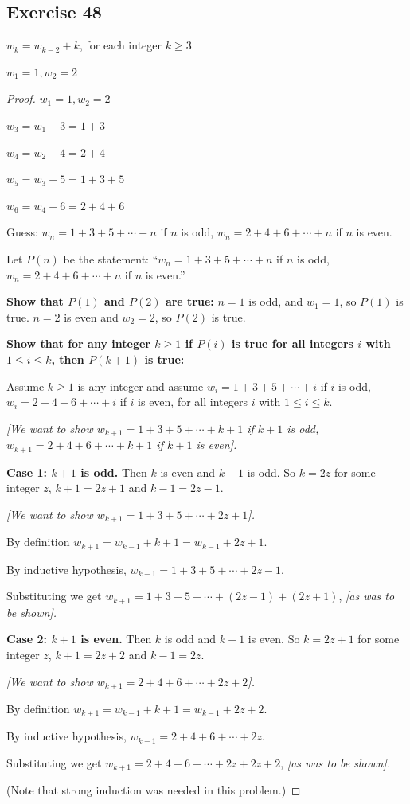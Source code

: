 \documentclass[14pt]{extarticle}
\newcommand{\dps}{\displaystyle}
\begin{document}
\subsection{Exercise 48}
\(w_k = w_{k-2} + k\), for each integer \(k \geq 3\)

\(w_1 = 1, w_2 = 2\)

\begin{proof}
\(w_1 = 1, w_2 = 2\)

\(w_3 = w_1 + 3 = 1 + 3\)

\(w_4 = w_2 + 4 = 2 + 4\)

\(w_5 = w_3 + 5 = 1 + 3 + 5\)

\(w_6 = w_4 + 6 = 2 + 4 + 6\)

Guess: \(w_n = 1 + 3 + 5 + \cdots + n\) if $n$ is odd, \(w_n = 2 + 4 + 6 + \cdots + n\) if $n$ is even.

Let \(P(n)\) be the statement: 
``\(w_n = 1 + 3 + 5 + \cdots + n\) if $n$ is odd, 
\(w_n = 2 + 4 + 6 + \cdots + n\) if $n$ is even.''

{\bf Show that $P(1)$ and $P(2)$ are true:} 
$n = 1$ is odd, and \(w_1 = 1\), so $P(1)$ is true. 
$n = 2$ is even and \(w_2 = 2\), so $P(2)$ is true.

{\bf Show that for any integer \(k \geq 1\) if $P(i)$ is true for all integers $i$ with \(1 \leq i \leq k\), then
$P(k+1)$ is true:}

Assume \(k \geq 1\) is any integer and assume 
\(w_i = 1 + 3 + 5 + \cdots + i\) if $i$ is odd, 
\(w_i = 2 + 4 + 6 + \cdots + i\) if $i$ is even,
for all integers $i$ with \(1 \leq i \leq k\).

{\it [We want to show 
\(w_{k+1} = 1 + 3 + 5 + \cdots + k+1\) if $k+1$ is odd, 
\(w_{k+1} = 2 + 4 + 6 + \cdots + k+1\) if $k+1$ is even].}

{\bf Case 1: $k+1$ is odd.} Then $k$ is even and $k-1$ is odd. 
So $k = 2z$ for some integer $z$, $k+1 = 2z+1$ and $k-1 = 2z-1$.

{\it [We want to show \(w_{k+1} = 1 + 3 + 5 + \cdots + 2z+1\)].}

By definition \(w_{k+1} = w_{k-1} + k+1 = w_{k-1} + 2z+1\).

By inductive hypothesis, \(\dps w_{k-1} = 1 + 3 + 5 + \cdots + 2z-1\).

Substituting we get \(\dps w_{k+1} = 1 + 3 + 5 + \cdots + (2z-1) + (2z+1)\), {\it [as was to be shown].}

{\bf Case 2: $k+1$ is even.} Then $k$ is odd and $k-1$ is even. 
So $k = 2z+1$ for some integer $z$, $k+1 = 2z+2$ and $k-1 = 2z$.

{\it [We want to show \(w_{k+1} = 2 + 4 + 6 + \cdots + 2z+2\)].}

By definition \(w_{k+1} = w_{k-1} + k + 1 = w_{k-1} + 2z+2\).

By inductive hypothesis, \(w_{k-1} = 2 + 4 + 6 + \cdots + 2z\).

Substituting we get \(w_{k+1} = 2 + 4 + 6 + \cdots + 2z + 2z+2\), {\it [as was to be shown].}

(Note that strong induction was needed in this problem.)
\end{proof}
\end{document}
